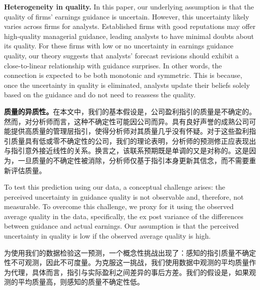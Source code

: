 \documentclass[12pt,a4paper]{article}
\newenvironment{original}
  {\par\medskip\noindent\ignorespaces}
  {\par\medskip}
\newenvironment{translation}
  {\par\noindent{\color{transblue}\ignorespaces}}
  {\par\bigskip}
\begin{document}
\begin{original}
\textbf{Heterogeneity in quality.} In this paper, our underlying assumption is that the quality of firms' earnings guidance is uncertain. However, this uncertainty likely varies across firms for analysts. Established firms with good reputations may offer high-quality managerial guidance, leading analysts to have minimal doubts about its quality. For these firms with low or no uncertainty in earnings guidance quality, our theory suggests that analysts' forecast revisions should exhibit a close-to-linear relationship with guidance surprises. In other words, the connection is expected to be both monotonic and symmetric. This is because, once the uncertainty in quality is eliminated, analysts update their beliefs solely based on the guidance and do not need to reassess the quality.
\end{original}
\begin{translation}
\textbf{质量的异质性。}在本文中，我们的基本假设是，公司盈利指引的质量是不确定的。然而，对分析师而言，这种不确定性可能因公司而异。具有良好声誉的成熟公司可能提供高质量的管理层指引，使得分析师对其质量几乎没有怀疑。对于这些盈利指引质量具有低或零不确定性的公司，我们的理论表明，分析师的预测修正应表现出与指引意外接近线性的关系。换言之，该联系预期既是单调的又是对称的。这是因为，一旦质量的不确定性被消除，分析师仅基于指引本身更新其信念，而不需要重新评估质量。
\end{translation}

\begin{original}
To test this prediction using our data, a conceptual challenge arises: the perceived uncertainty in guidance quality is not observable and, therefore, not measurable. To overcome this challenge, we proxy for it using the observed average quality in the data, specifically, the ex post variance of the differences between guidance and actual earnings. Our assumption is that the perceived uncertainty in quality is low if the observed average quality is high.
\end{original}
\begin{translation}
为使用我们的数据检验这一预测，一个概念性挑战出现了：感知的指引质量不确定性不可观测，因此不可度量。为克服这一挑战，我们使用数据中观测的平均质量作为代理，具体而言，指引与实际盈利之间差异的事后方差。我们的假设是，如果观测的平均质量高，则感知的质量不确定性低。
\end{translation}
\end{document}
